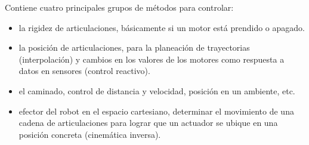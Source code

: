 Contiene cuatro principales grupos de métodos para controlar:
\begin{itemize}
\item {} 
la rigidez de articulaciones, básicamente si un motor está prendido o apagado.

\item {} 
la posición de articulaciones, para la planeación de trayectorias (interpolación) y cambios en los valores de los motores como respuesta a datos en sensores (control reactivo).

\item {} 
el caminado, control de distancia y velocidad, posición en un ambiente, etc.

\item {} 
efector del robot en el espacio cartesiano, determinar el movimiento de una cadena de articulaciones para lograr que un actuador se ubique en una posición concreta (cinemática inversa).

\end{itemize}












